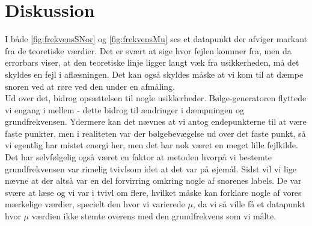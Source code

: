 \documentclass[A2_main.tex]{subfiles}
\begin{document}
\section{Diskussion}
I både \cref{fig:frekvensSNor} og \cref{fig:frekvensMu} ses et datapunkt der afviger markant fra de teoretiske værdier. Det er svært at sige hvor fejlen kommer fra, men da errorbars viser, at den teoretiske linje ligger langt væk fra usikkerheden, må det skyldes en fejl i aflæsningen. Det kan også skyldes måske at vi kom til at dæmpe snoren ved at røre ved den under en afmåling.
\\ Ud over det, bidrog opsættelsen til nogle usikkerheder. Bølge-generatoren flyttede vi engang i mellem - dette bidrog til ændringer i dæmpningen og grundfrekvensen.
Ydermere kan det nævnes at vi antog endepunkterne til at være faste punkter, men i realiteten var der bølgebevægelse ud over det faste punkt, så vi egentlig har mistet energi her, men det har nok været en meget lille fejlkilde. Det har selvfølgelig også været en faktor at metoden hvorpå vi bestemte grundfrekvensen var rimelig tvivlsom idet at det var på øjemål. 
Sidst vil vi lige nævne at der altså var en del forvirring omkring nogle af snorenes labels. De var svære at læse og vi var i tvivl om flere, hvilket måske kan forklare nogle af vores mærkelige værdier, specielt den hvor vi varierede $\mu$, da vi så ville få et datapunkt hvor $\mu$ værdien ikke stemte overens med den grundfrekvens som vi målte.
\end{document}
